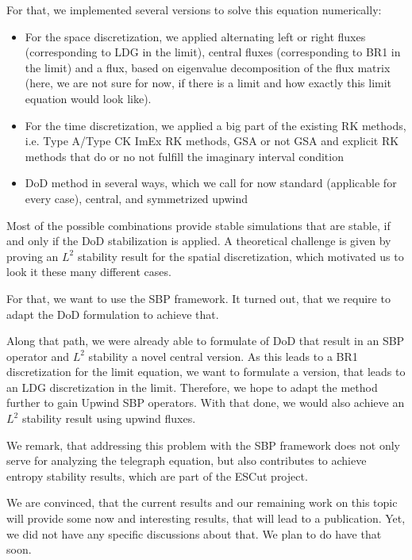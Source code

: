 \documentclass[]{article}
\begin{document}
For that, we implemented several versions to solve this equation numerically:
\begin{itemize}
	\item For the space discretization, we applied alternating left or right fluxes (corresponding to LDG in the limit), central fluxes (corresponding to BR1 in the limit)
	and a flux, based on eigenvalue decomposition of the flux matrix (here, we are not sure for now, if there is a limit and how exactly this limit equation would look like).
	\item For the time discretization, we applied a big part of the existing RK methods, i.e. Type A/Type CK ImEx RK methods, GSA or not GSA and explicit RK methods
	 that do or no not fulfill the imaginary interval condition
	\item DoD method in several ways, which we call for now standard (applicable for every case), central, and symmetrized upwind
\end{itemize}
Most of the possible combinations provide stable simulations that are stable, if and only if the DoD stabilization is applied. 
A theoretical challenge is given by proving an $L^2$ stability result for the  spatial discretization, which motivated us to look it these many different cases.

For that, we want to use the SBP framework. It turned out, that we require to adapt the DoD formulation to achieve that. 

Along that path, we were already able to formulate of DoD that result in an SBP operator and $L^2$ stability a novel central version. 
As this leads to a BR1 discretization for the limit equation, we want to formulate a version, that leads to an LDG discretization in the limit.
Therefore, we hope to adapt the method further to gain Upwind SBP operators. 
With that done, we would also achieve an $L^2$ stability result using upwind fluxes.

We remark, that addressing this problem with the SBP framework does not only serve for analyzing the telegraph equation, but also contributes to achieve entropy stability results, which are part of the ESCut project.

We are convinced, that the current results and our remaining work on this topic will provide some now and interesting results, that will lead to a publication.
Yet, we did not have any specific discussions about that. We plan to do have that soon.



\end{document}
